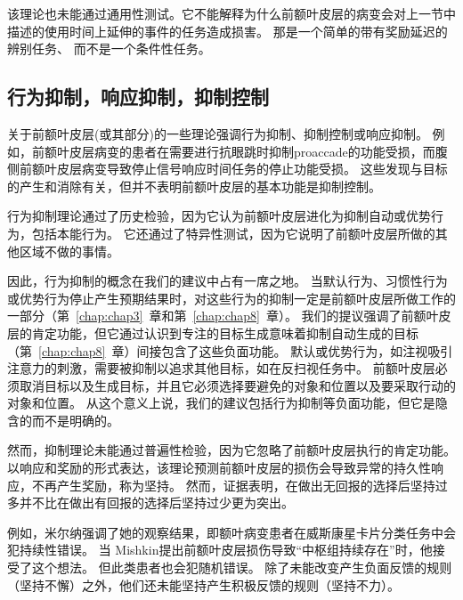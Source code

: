该理论也未能通过通用性测试。它不能解释为什么前额叶皮层的病变会对上一节中描述的使用时间上延伸的事件的任务造成损害。
那是一个简单的带有奖励延迟的辨别任务、 而不是一个条件性任务\cite{browning2008prefrontal}。



\subsection{行为抑制，响应抑制，抑制控制}

关于前额叶皮层(或其部分)的一些理论强调行为抑制、抑制控制或响应抑制\cite{roberts2000inhibitory,eagle2008neuropsychopharmacology}。
例如，前额叶皮层病变的患者在需要进行抗眼跳时抑制proaccade的功能受损\cite{ploner2005prefrontal}，而腹侧前额叶皮层病变导致停止信号响应时间任务的停止功能受损\cite{aron2003stop}。
这些发现与目标的产生和消除有关，但并不表明前额叶皮层的基本功能是抑制控制。
\par


行为抑制理论通过了历史检验，因为它认为前额叶皮层进化为抑制自动或优势行为，包括本能行为。
它还通过了特异性测试，因为它说明了前额叶皮层所做的其他区域不做的事情。
\par


因此，行为抑制的概念在我们的建议中占有一席之地。 
当默认行为、习惯性行为或优势行为停止产生预期结果时，对这些行为的抑制一定是前额叶皮层所做工作的一部分（第~\ref{chap:chap3}~章和第~\ref{chap:chap8}~章）。
我们的提议强调了前额叶皮层的肯定功能，但它通过认识到专注的目标生成意味着抑制自动生成的目标（第~\ref{chap:chap8}~章）间接包含了这些负面功能。 
默认或优势行为，如注视吸引注意力的刺激，需要被抑制以追求其他目标，如在反扫视任务中。
前额叶皮层必须取消目标以及生成目标，并且它必须选择要避免的对象和位置以及要采取行动的对象和位置。
从这个意义上说，我们的建议包括行为抑制等负面功能，但它是隐含的而不是明确的。
\par


然而，抑制理论未能通过普遍性检验，因为它忽略了前额叶皮层执行的肯定功能。
以响应和奖励的形式表达，该理论预测前额叶皮层的损伤会导致异常的持久性响应，不再产生奖励，称为坚持。
然而，证据表明，在做出无回报的选择后坚持过多并不比在做出有回报的选择后坚持过少更为突出。
\par


例如，米尔纳\cite{milner1963effects}强调了她的观察结果，即额叶病变患者在威斯康星卡片分类任务中会犯持续性错误。
当 Mishkin\cite{mishkin1964perseveration}提出前额叶皮层损伤导致“中枢组持续存在”时，他接受了这个想法。
但此类患者也会犯随机错误\cite{barcelo2002both}。
除了未能改变产生负面反馈的规则（坚持不懈）之外，他们还未能坚持产生积极反馈的规则（坚持不力）。
\par


